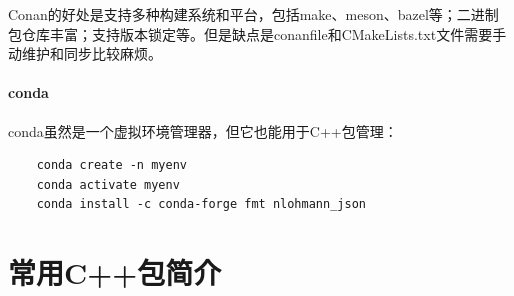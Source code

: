 Conan的好处是支持多种构建系统和平台，包括make、meson、bazel等；二进制包仓库丰富；支持版本锁定等。但是缺点是conanfile和CMakeLists.txt文件需要手动维护和同步比较麻烦。

\paragraph{conda} conda虽然是一个虚拟环境管理器，但它也能用于C++包管理：
\begin{verbatim}
    conda create -n myenv
    conda activate myenv
    conda install -c conda-forge fmt nlohmann_json
\end{verbatim}

\section{常用C++包简介}